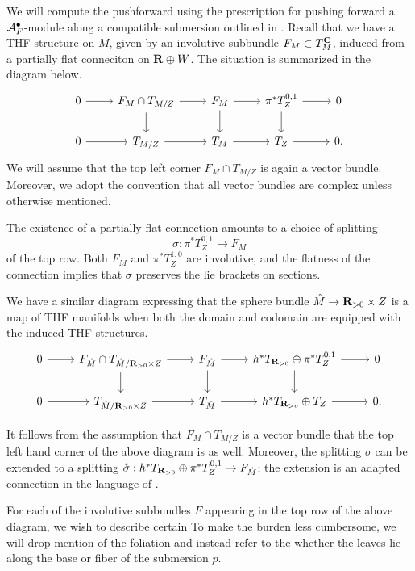 We will compute the pushforward using the prescription for pushing forward a $\mathcal A^{\bullet}_{F}$-module along a compatible submersion outlined in \cite{KormanThesis}. Recall that we have a THF structure on $M$, given by an involutive subbundle $F_{M}\subset T^{\mathbf{C}}_{M}$, induced from a partially flat conneciton on $\mathbf{R}\oplus W$. The situation is summarized in the diagram below.
\[
  \begin{tikzcd}
    0 \ar[r] & F_{M}\cap T_{M/Z}\ar[r]\ar[d] & F_{M}\ar[r]\ar[d]  & \pi^{*}T^{0,1}_{Z}\ar[r]\ar[d] & 0 \\
    0 \ar[r] & T_{M/Z}\ar[r] & T_{M}\ar[r] & T_{Z}\ar[r] & 0.
  \end{tikzcd}
\]
We will assume that the top left corner $F_{M}\cap T_{M/Z}$ is again a vector bundle. Moreover, we adopt the convention that all vector bundles are complex unless otherwise mentioned.

The existence of a partially flat connection amounts to a choice of splitting \[\sigma \colon \pi^{*}T^{0,1}_{Z}\to F_{M}\] of the top row. Both $F_{M}$ and $\pi^{*}T^{1,0}_{Z}$ are involutive, and the flatness of the connection implies that $\sigma$ preserves the lie brackets on sections.

We have a similar diagram expressing that the sphere bundle $\mathring M \to \mathbf{R}_{>0}\times Z$ is a map of THF manifolds when both the domain and codomain are equipped with the induced THF structures.
\[
  \begin{tikzcd}
    0 \ar[r] & F_{\mathring M}\cap T_{\mathring M/\R_{>0}\times Z}\ar[r]\ar[d] & F_{\mathring M}\ar[r]\ar[d]  & h^{*}T_{\R_{>0}}\oplus\pi^{*}T^{0,1}_{Z}\ar[r]\ar[d] & 0 \\
    0 \ar[r] & T_{\mathring M/\R_{>0}\times Z}\ar[r] & T_{\mathring M}\ar[r] & h^{*}T_{\R_{>o}}\oplus T_{Z}\ar[r] & 0.
  \end{tikzcd}
\]

It follows from the assumption that $F_{M}\cap T_{M/Z}$ is a vector bundle that the top left hand corner of the above diagram is as well. Moreover, the splitting $\sigma$ can be extended to a splitting $\mathring \sigma : h^{*}T_{\mathbf{R}_{>0}}\oplus \pi^{*}T^{0,1}_{Z}\to F_{\mathring M}$; the extension is an adapted connection in the language of \cite{KamberTondeur}.

For each of the involutive subbundles $F$ appearing in the top row of the above diagram, we wish to describe certain  To make the burden less cumbersome, we will drop mention of the foliation and instead refer to the whether the leaves lie along the base or fiber of the submersion $p$.

